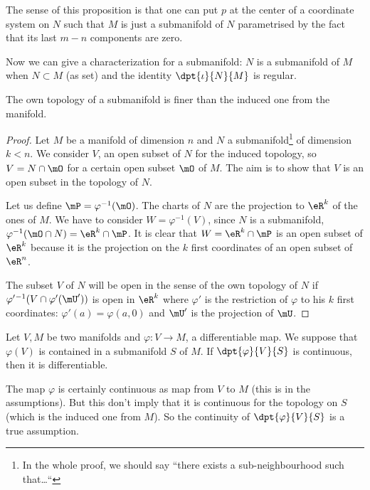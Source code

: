 The sense of this proposition is that one can put $p$ at the center of a coordinate system on $N$ such that $M$ is just a submanifold of $N$ parametrised by the fact that its last $m-n$ components are zero.

Now we can give a characterization for a submanifold: $N$ is a submanifold of $M$ when $N\subset M$ (as set) and the identity $\dpt{\iota}{N}{M}$ is regular.\label{pg:caract_subvar}

\begin{proposition}
The own topology of a submanifold is finer than the induced one from the manifold.
\label{prop:topo_sub_manif}
\end{proposition}

\begin{proof}
Let $M$ be a manifold of dimension $n$ and $N$ a submanifold\footnote{In the whole proof, we should say ``there exists a sub-neighbourhood such that\ldots``} of dimension $k<n$. We consider $V$, an open subset of $N$ for the induced topology, so $V=N\cap\mO$ for a certain open subset $\mO$ of $M$. The aim is to show that $V$ is an open subset in the topology of $N$.

Let us define $\mP=\varphi^{-1}(\mO)$.  The charts of $N$ are the projection to $\eR^k$ of the ones of $M$. We have to consider $W=\varphi^{-1}(V)$, since $N$ is a submanifold, $\varphi^{-1}(\mO\cap N)=\eR^k\cap\mP$. It is clear that $W=\eR^k\cap\mP$ is an open subset of $\eR^k$ because it is the projection on the $k$ first coordinates of an open subset of $\eR^n$.

The subset $V$ of $N$ will be open in the sense of the own topology of $N$ if $\varphi'{}^{-1}(V\cap\varphi'(\mU'))$ is open in $\eR^k$ where $\varphi'$ is the restriction of $\varphi$ to his $k$ first coordinates: $\varphi'(a)=\varphi(a,0)$ and $\mU'$ is the projection of $\mU$.
\end{proof}


\begin{lemma}
Let $V,M$ be two manifolds and $\varphi\colon V\to M$, a differentiable map. We suppose that $\varphi(V)$ is contained in a submanifold $S$ of $M$. If $\dpt{\varphi}{V}{S}$ is continuous, then it is differentiable.
\label{lem:var_cont_diff}
\end{lemma}

\begin{remark}
The map $\varphi$ is certainly continuous as map from $V$ to $M$ (this is in the assumptions). But this don't imply that it is continuous for the topology on $S$ (which is the induced one from $M$). So the continuity of $\dpt{\varphi}{V}{S}$ is a true assumption.
\end{remark}

